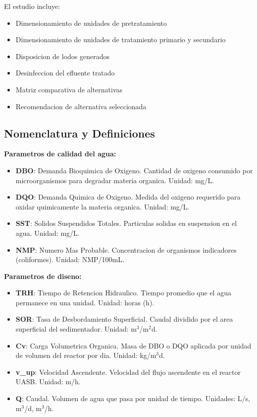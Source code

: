 \documentclass[12pt,a4paper]{article}
\begin{document}
El estudio incluye:
\begin{itemize}
    \item Dimensionamiento de unidades de pretratamiento
    \item Dimensionamiento de unidades de tratamiento primario y secundario
    \item Disposicion de lodos generados
    \item Desinfeccion del efluente tratado
    \item Matriz comparativa de alternativas
    \item Recomendacion de alternativa seleccionada
\end{itemize}

\subsection{Nomenclatura y Definiciones}

\textbf{Parametros de calidad del agua:}
\begin{itemize}
    \item \textbf{DBO}: Demanda Bioquimica de Oxigeno. Cantidad de oxigeno consumido por microorganismos 
    para degradar materia organica. Unidad: mg/L.
    \item \textbf{DQO}: Demanda Quimica de Oxigeno. Medida del oxigeno requerido para oxidar quimicamente 
    la materia organica. Unidad: mg/L.
    \item \textbf{SST}: Solidos Suspendidos Totales. Particulas solidas en suspension en el agua. Unidad: mg/L.
    \item \textbf{NMP}: Numero Mas Probable. Concentracion de organismos indicadores (coliformes). Unidad: NMP/100mL.
\end{itemize}

\textbf{Parametros de diseno:}
\begin{itemize}
    \item \textbf{TRH}: Tiempo de Retencion Hidraulico. Tiempo promedio que el agua permanece en una unidad. 
    Unidad: horas (h).
    \item \textbf{SOR}: Tasa de Desbordamiento Superficial. Caudal dividido por el area superficial del 
    sedimentador. Unidad: m$^3$/m$^2$\textperiodcentered d.
    \item \textbf{Cv}: Carga Volumetrica Organica. Masa de DBO o DQO aplicada por unidad de volumen del reactor 
    por dia. Unidad: kg/m$^3$\textperiodcentered d.
    \item \textbf{v\_up}: Velocidad Ascendente. Velocidad del flujo ascendente en el reactor UASB. 
    Unidad: m/h.
    \item \textbf{Q}: Caudal. Volumen de agua que pasa por unidad de tiempo. Unidades: L/s, m$^3$/d, m$^3$/h.
\end{itemize}
\end{document}
